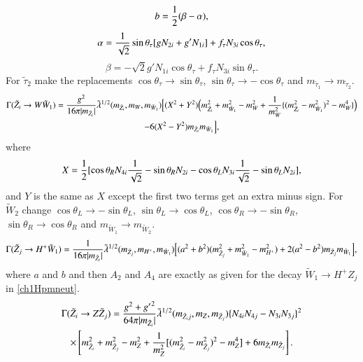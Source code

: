 \documentclass[final,3p,times]{elsarticle}
\begin{document}
\begin{equation}
b = {1 \over 2} (\beta - \alpha) ,
\end{equation}
\begin{equation}
\alpha = {1 \over \sqrt{2}} \sin \theta_\tau [g N_{2i} + g' N_{1i}] + f_\tau N_{3i} \cos \theta_\tau,
\end{equation}
\begin{equation}
\beta = -\sqrt{2} g' N_{1i} \cos \theta_\tau + f_\tau N_{3i} \sin \theta_\tau.
\end{equation}
For $\tilde{\tau}_2$ make the replacements $\cos\theta_\tau \rightarrow \sin\theta_\tau$, $\sin\theta_\tau \rightarrow -\cos\theta_\tau$ and $m_{\tilde{\tau}_1} \rightarrow m_{\tilde{\tau}_2}$.
\begin{multline}\label{neutWch1}
\Gamma (\tilde{Z}_i \rightarrow W \tilde{W}_{1}) = {g^2 \over 16\pi |m_{\tilde{Z}_i}|} \tilde{\lambda}^{1/2} (m_{\tilde{Z}_i}, m_W, m_{\tilde{W}_{1}}) \Big[(X^2 +Y^2) \Big(m_{\tilde{Z}_{i}}^2 + m_{\tilde{W}_1}^2 -m_W^2 + {1 \over m_W^2}\{(m_{\tilde{Z}_i}^2 - m_{\tilde{W}_1}^2)^2 - m_W^4\}\Big) \\ - 6(X^2 -Y^2)m_{\tilde{Z}_i}m_{\tilde{W}_1}\Big],
\end{multline} 
where
\begin{equation}
X = {1 \over 2}[\cos \theta_R N_{4i} {1 \over \sqrt{2}} - \sin \theta_R N_{2i} - \cos \theta_L N_{3i} {1 \over \sqrt{2}} - \sin \theta_L N_{2i}],
\end{equation}
and $Y$ is the same as $X$ except the first two terms get an extra minus sign. For $\tilde{W}_2$ change $\cos\theta_L \rightarrow -\sin\theta_L$, $\sin\theta_L \rightarrow \cos\theta_L$, $\cos\theta_R \rightarrow -\sin\theta_R$, $\sin\theta_R \rightarrow \cos\theta_R$ and $m_{\tilde{W}_1} \rightarrow m_{\tilde{W}_2}$.
\begin{equation}\label{neutHpmch1}
\Gamma (\tilde{Z}_j \rightarrow H^+ \tilde{W}_{1}) = {1 \over 16\pi |m_{\tilde{Z}_i}|} \tilde{\lambda}^{1/2} (m_{\tilde{Z}_j}, m_{H^+}, m_{\tilde{W}_{1}}) \Big[(a^2 +b^2) (m_{\tilde{Z}_{j}}^2 + m_{\tilde{W}_1}^2 -m_{H^+}^2) + 2(a^2 -b^2)m_{\tilde{Z}_j}m_{\tilde{W}_1}\Big],
\end{equation} 
where $a$ and $b$ and then $A_2$ and $A_4$ are exactly as given for the decay $\tilde{W}_1 \rightarrow H^+ Z_j$ in \eqref{ch1Hpmneut}.
\begin{multline}\label{neutZneut}
\Gamma (\tilde{Z}_i \rightarrow Z \tilde{Z}_{j}) = {g^2 + {g'}^2 \over 64\pi |m_{\tilde{Z}_i}|} \tilde{\lambda}^{1/2} (m_{\tilde{Z}_ij}, m_{Z}, m_{\tilde{Z}_{j}}) \{N_{4i}N_{4j} - N_{3i}N_{3j}\}^2 \\ \times \left[m_{\tilde{Z}_{i}}^2 + m_{\tilde{Z}_j}^2 -m_{Z}^2 +{1 \over m_Z^2}[(m_{\tilde{Z}_i}^2 - m_{\tilde{Z}_j}^2)^2 - m_Z^4] + 6m_{\tilde{Z}_i}m_{\tilde{Z}_j}\right].
\end{multline} 
\end{document}
